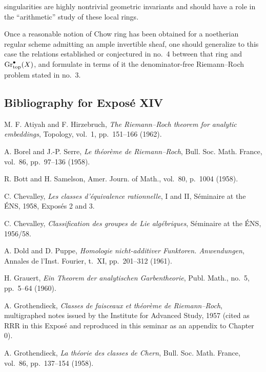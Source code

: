 singularities are highly nontrivial geometric invariants and should have a
role in the ``arithmetic'' study of these local rings.

Once a reasonable notion of Chow ring has been obtained for a noetherian
regular scheme admitting an ample invertible sheaf, one should generalize
to this case the relations established or conjectured in no.~4 between
that ring and $\operatorname{Gr}_{\mathrm{top}}^\bullet(X)$, and formulate in terms of it the
denominator-free Riemann--Roch problem stated in no.~3.

\subsection*{Bibliography for Exposé XIV}
\begin{enumerate}[label={\textup{[\arabic*]}}]
\item M. F. Atiyah and F. Hirzebruch, \emph{The Riemann--Roch theorem for
analytic embeddings}, Topology, vol.~1, pp.~151--166 (1962).
\item A. Borel and J.-P. Serre, \emph{Le théorème de Riemann--Roch}, Bull.
Soc. Math. France, vol.~86, pp.~97--136 (1958).
\item R. Bott and H. Samelson, Amer. Journ. of Math., vol.~80, p.~1004
(1958).
\item C. Chevalley, \emph{Les classes d'équivalence rationnelle}, I and II,
Séminaire at the ÉNS, 1958, Exposés 2 and 3.
\item C. Chevalley, \emph{Classification des groupes de Lie algébriques},
Séminaire at the ÉNS, 1956/58.
\item A. Dold and D. Puppe, \emph{Homologie nicht-additiver Funktoren.
Anwendungen}, Annales de l'Inst. Fourier, t.~XI, pp.~201--312 (1961).
\item H. Grauert, \emph{Ein Theorem der analytischen Garbentheorie}, Publ.
Math., no.~5, pp.~5--64 (1960).
\item A. Grothendieck, \emph{Classes de faisceaux et théorème de
Riemann--Roch}, multigraphed notes issued by the Institute for Advanced
Study, 1957 (cited as RRR in this Exposé and reproduced in this seminar as
an appendix to Chapter 0).
\item A. Grothendieck, \emph{La théorie des classes de Chern}, Bull. Soc.
Math. France, vol.~86, pp.~137--154 (1958).


\end{enumerate}

